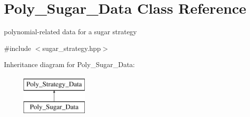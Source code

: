 \hypertarget{class_poly___sugar___data}{}\section{Poly\+\_\+\+Sugar\+\_\+\+Data Class Reference}
\label{class_poly___sugar___data}


polynomial-\/related data for a sugar strategy  




{\ttfamily \#include $<$sugar\+\_\+strategy.\+hpp$>$}

Inheritance diagram for Poly\+\_\+\+Sugar\+\_\+\+Data\+:\begin{figure}[H]
\begin{center}
\leavevmode
\includegraphics[height=2.000000cm]{class_poly___sugar___data}
\end{center}
\end{figure}
